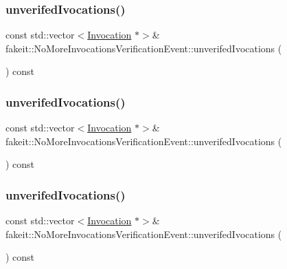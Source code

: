 \subsubsection{\texorpdfstring{unverifedIvocations()}{unverifedIvocations()}\hspace{0.1cm}{\footnotesize\ttfamily [6/9]}}
{\footnotesize\ttfamily const std\+::vector$<$\mbox{\hyperlink{structfakeit_1_1Invocation}{Invocation}} $\ast$$>$\& fakeit\+::\+No\+More\+Invocations\+Verification\+Event\+::unverifed\+Ivocations (\begin{DoxyParamCaption}{ }\end{DoxyParamCaption}) const\hspace{0.3cm}{\ttfamily [inline]}}

\mbox{\label{structfakeit_1_1NoMoreInvocationsVerificationEvent_aaff3cb0916a4fe853f6f4e5fcc7f2632}} 
\subsubsection{\texorpdfstring{unverifedIvocations()}{unverifedIvocations()}\hspace{0.1cm}{\footnotesize\ttfamily [7/9]}}
{\footnotesize\ttfamily const std\+::vector$<$\mbox{\hyperlink{structfakeit_1_1Invocation}{Invocation}} $\ast$$>$\& fakeit\+::\+No\+More\+Invocations\+Verification\+Event\+::unverifed\+Ivocations (\begin{DoxyParamCaption}{ }\end{DoxyParamCaption}) const\hspace{0.3cm}{\ttfamily [inline]}}

\mbox{\label{structfakeit_1_1NoMoreInvocationsVerificationEvent_aaff3cb0916a4fe853f6f4e5fcc7f2632}} 
\subsubsection{\texorpdfstring{unverifedIvocations()}{unverifedIvocations()}\hspace{0.1cm}{\footnotesize\ttfamily [8/9]}}
{\footnotesize\ttfamily const std\+::vector$<$\mbox{\hyperlink{structfakeit_1_1Invocation}{Invocation}} $\ast$$>$\& fakeit\+::\+No\+More\+Invocations\+Verification\+Event\+::unverifed\+Ivocations (\begin{DoxyParamCaption}{ }\end{DoxyParamCaption}) const\hspace{0.3cm}{\ttfamily [inline]}}

